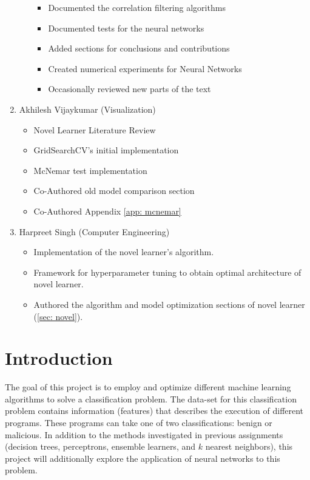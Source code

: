 \documentclass[paper=a4, fontsize=11pt]{scrartcl} %
\begin{document}
\begin{enumerate}
\begin{itemize}
		\begin{itemize}
			\item Documented the correlation filtering algorithms
			\item Documented tests for the neural networks
			\item Added sections for conclusions and contributions
			\item Created numerical experiments for Neural Networks
			\item Occasionally reviewed new parts of the text
		\end{itemize}  
	\end{itemize} 
	\item Akhilesh Vijaykumar (Visualization)
	\begin{itemize}
		\item Novel Learner Literature Review
		\item GridSearchCV's initial implementation
		\item McNemar test implementation
		\item Co-Authored old model comparison section
		\item Co-Authored Appendix \ref{app: mcnemar}
	\end{itemize}
	\item Harpreet Singh (Computer Engineering)
	\begin{itemize}
		\item Implementation of the novel learner's algorithm.
                \item Framework for hyperparameter tuning to obtain optimal architecture of novel learner.
                \item Authored the algorithm and model optimization sections of novel learner (\ref{sec: novel}).
	\end{itemize} 
\end{enumerate}

\section{Introduction} \label{sec: intro}

The goal of this project is to employ and optimize different machine learning algorithms to solve a classification problem.
The data-set for this classification problem contains information (features) that describes the execution of different programs.
These programs can take one of two classifications: benign or malicious.
In addition to the methods investigated in previous assignments (decision trees, perceptrons, ensemble learners, and $k$ nearest neighbors), this project will additionally explore the application of neural networks to this problem.
\\
\end{document}
